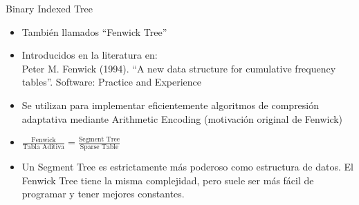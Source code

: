 \documentclass{beamer}
\begin{document}
\begin{frame}{Binary Indexed Tree}
  \begin{itemize}
    \item También llamados ``Fenwick Tree''
    \item Introducidos en la literatura en: \\
            Peter M. Fenwick (1994). ``A new data structure for cumulative frequency tables''. Software: Practice and Experience
    \item Se utilizan para implementar eficientemente algoritmos de compresión adaptativa mediante Arithmetic Encoding (motivación original de Fenwick)
    \item $\frac{\mbox{Fenwick}}{\mbox{Tabla Aditiva}} = \frac{\mbox{Segment Tree}}{\mbox{Sparse Table}}$
    \item Un Segment Tree es estrictamente más poderoso como estructura de datos. El Fenwick Tree tiene la misma complejidad, pero suele ser más fácil
           de programar y tener mejores constantes.
  \end{itemize}
\end{frame}
\end{document}
